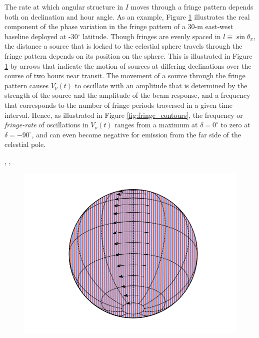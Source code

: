 \documentclass[twocolumn,apj,numberedappendix]{emulateapj}
\begin{document}
The rate at which angular structure in $I$ moves through a fringe pattern depends both on declination
and hour angle.  As an example, Figure \ref{fig:ew_fringe} illustrates the real component of the phase
variation in the fringe pattern of a 30-m east-west baseline deployed at -30$^\circ$ latitude.
Though fringes are evenly spaced in $l\equiv\sin\theta_x$, the distance a source that is locked to the celestial
sphere travels through the fringe pattern depends on its position on the sphere. This is illustrated in Figure
\ref{fig:ew_fringe} by arrows that indicate the motion of sources at differing declinations over the course
of two hours near transit.  The movement of a source through the fringe pattern causes $V_\nu(t)$ to oscillate
with an amplitude that is determined by the strength of the source and the amplitude of the beam response,
and a frequency that corresponds to the number of fringe periods traversed in a given time interval.  Hence,
as illustrated in Figure \ref{fig:fringe_contours}, the frequency or {\it fringe-rate} of oscillations in $V_\nu(t)$
ranges from a maximum at $\delta=0^\circ$ to zero at $\delta=-90^\circ$, and can even become negative
for emission from the far side of the celestial pole.






\citep{parsons_backer2009}, \citep{shaw_et_al2013}, 

\begin{figure}
\includegraphics[width=.9\columnwidth]{plots/ew_fringe.png}
\caption{
}\label{fig:ew_fringe}
\end{figure}
\end{document}
